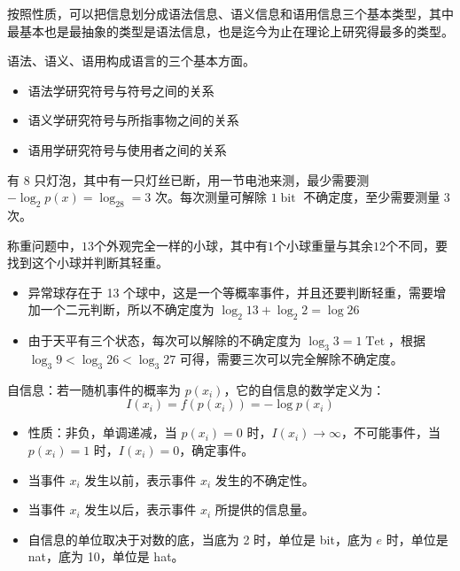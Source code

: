 \begin{remark}
    按照性质，可以把信息划分成语法信息、语义信息和语用信息三个基本类型，其中最基本也是最抽象的类型是语法信息，也是迄今为止在理论上研究得最多的类型。

    语法、语义、语用构成语言的三个基本方面。
    \begin{itemize}
        \item 语法学研究符号与符号之间的关系
        \item 语义学研究符号与所指事物之间的关系
        \item 语用学研究符号与使用者之间的关系
    \end{itemize}
\end{remark}

\begin{remark}
    有 8 只灯泡，其中有一只灯丝已断，用一节电池来测，最少需要测 $-\log_2p(x) = \log_28 = 3$ 次。每次测量可解除 $1\operatorname{bit}$ 不确定度，至少需要测量 3 次。
\end{remark}

\begin{remark}
    称重问题中，$13$个外观完全一样的小球，其中有$1$个小球重量与其余$12$个不同，要找到这个小球并判断其轻重。

    \begin{itemize}
        \item 异常球存在于 13 个球中，这是一个等概率事件，并且还要判断轻重，需要增加一个二元判断，所以不确定度为 $\log_2 13 + \log_2 2 = \log 26$
        \item 由于天平有三个状态，每次可以解除的不确定度为 $\log_3 3 = 1\operatorname{Tet}$，根据 $\log _{3} 9<\log _{3} 26<\log _{3} 27$ 可得，需要三次可以完全解除不确定度。
    \end{itemize}
\end{remark}

\begin{remark}
    自信息：若一随机事件的概率为 $p(x_i)$，它的自信息的数学定义为：\[I(x_i) = f(p(x_i)) = -\log p(x_i)\]
    \begin{itemize}
        \item 性质：非负，单调递减，当 $p(x_i) = 0$ 时，$I(x_i) \to \infty$，不可能事件，当 $p(x_i) = 1$ 时，$I(x_i) = 0$，确定事件。
        \item 当事件 $x_i$ 发生以前，表示事件 $x_i$ 发生的不确定性。
        \item 当事件 $x_i$ 发生以后，表示事件 $x_i$ 所提供的信息量。
        \item 自信息的单位取决于对数的底，当底为 2 时，单位是 bit，底为 $e$ 时，单位是 nat，底为 10，单位是 hat。
    \end{itemize}
\end{remark}

